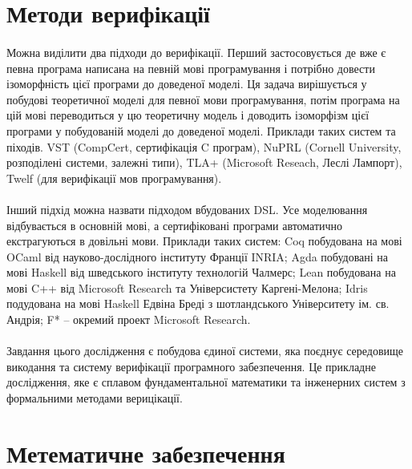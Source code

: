 \newpage
\section{Методи верифікації}

\paragraph{}
Можна виділити два підходи до верифікації. Перший застосовується де вже є
певна програма написана на певній мові програмування і потрібно довести ізоморфність
цієї програми до доведеної моделі. Ця задача вирішується у побудові теоретичної моделі
для певної мови програмування, потім програма на цій мові переводиться у цю
теоретичну модель і доводить ізоморфізм цієї програми у побудованій моделі до доведеної моделі.
Приклади таких систем та піходів. VST (CompCert, сертифікація C програм),
NuPRL (Cornell University, розподілені системи, залежні типи),
TLA+ (Microsoft Reseach, Леслі Лампорт), Twelf (для верифікації мов програмування).

\paragraph{}
Інший підхід можна назвати підходом вбудованих DSL. Усе моделювання відбувається
в основній мові, а сертифіковані програми автоматично екстрагуються в довільні мови.
Приклади таких систем: Coq побудована на мові OCaml від науково-дослідного
інституту Франції INRIA; Agda побудовані на мові Haskell від шведського інституту технологій Чалмерс;
Lean побудована на мові C++ від Microsoft Research та Універсистету Каргені-Мелона;
Idris подудована на мові Haskell Едвіна Бреді з шотландського Університету ім. св. Андрія;
F* -- окремий проект Microsoft Research.

\paragraph{}
Завдання цього дослідження є побудова єдиної системи, яка поєднує середовище
викодання та систему верифікації програмного забезпечення. Це прикладне дослідження,
яке є сплавом фундаментальної математики та інженерних систем з формальними методами верицікації.

\newpage
\section{Метематичне забезпечення}
\vspace{0.3cm}

